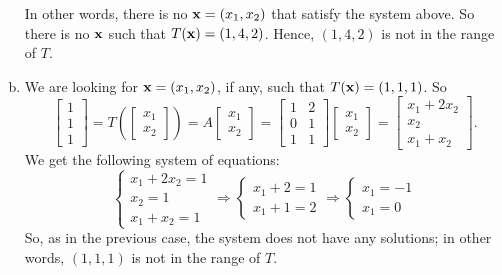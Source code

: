 \begin{enumerate}[a)]
In other words, there is no ${\bf x}=(x_1,x_2)$ that satisfy the system above. So there is no ${\bf x}$ such that $T({\bf x})=(1,4,2)$. Hence, $(1,4,2)$ is not in the range of $T$.
	\item We are looking for ${\bf x}=(x_1,x_2)$, if any, such that $T({\bf x})=(1,1,1)$.
So
$$
\left[\begin{array}{c}1\\1\\1\end{array}\right] =
T\left(\left[\begin{array}{c}x_1\\x_2\end{array}\right]\right) =
A\left[\begin{array}{c}x_1\\x_2\end{array}\right] =
\left[\begin{array}{cc}1&2\\0&1\\1&1\end{array}\right]\left[\begin{array}{c}x_1\\x_2\end{array}\right]=\left[\begin{array}{c}x_1+2x_2\\x_2\\x_1+x_2\end{array}\right].
$$
We get the following system of equations:
$$
\left\{\begin{array}{c}x_1+2x_2=1\\x_2=1\\x_1+x_2=1\end{array}\right.\Rightarrow
\left\{\begin{array}{c}x_1+2=1\\x_1+1=2\end{array}\right.\Rightarrow
\left\{\begin{array}{c}x_1=-1\\x_1=0\end{array}\right.
$$
So, as in the previous case, the system does not have any solutions; in other words, $(1,1,1)$ is not in the range of $T$.
\end{enumerate}



